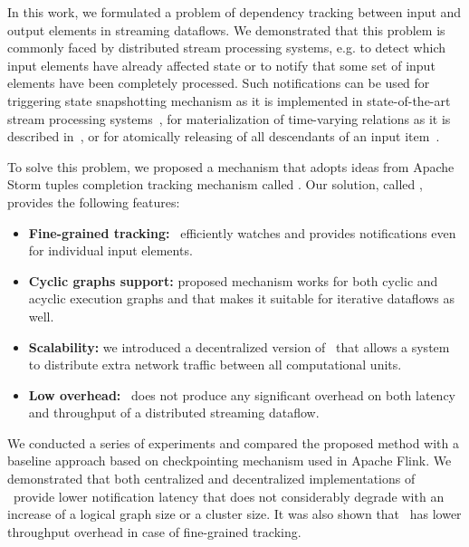 \label {fs-acker-conclusion}

In this work, we formulated a problem of dependency tracking between input and output elements in streaming dataflows. We demonstrated that this problem is commonly faced by distributed stream processing systems, e.g. to detect which input elements have already affected state or to notify that some set of input elements have been completely processed. Such notifications can be used for triggering state snapshotting mechanism as it is implemented in state-of-the-art stream processing systems~\cite{Carbone:2017:SMA:3137765.3137777, apache:storm}, for materialization of time-varying relations as it is described in~\cite{Begoli:2019:OSR:3299869.3314040}, or for atomically releasing of all descendants of an input item~\cite{we2018adbis}.

To solve this problem, we proposed a mechanism that adopts ideas from Apache Storm tuples completion tracking mechanism called \acker. Our solution, called \tracker, provides the following features:
\begin{itemize}
    \item {\bf Fine-grained tracking:} \tracker\ efficiently watches and provides notifications even for individual input elements.
    \item {\bf Cyclic graphs support:} proposed mechanism works for both cyclic and acyclic execution graphs and that makes it suitable for iterative dataflows as well. 
    \item {\bf Scalability:} we introduced a decentralized version of \tracker\ that allows a system to distribute extra network traffic between all computational units. 
    \item {\bf Low overhead:} \tracker\ does not produce any significant overhead on both latency and throughput of a distributed streaming dataflow.
\end{itemize}

We conducted a series of experiments and compared the proposed method with a baseline approach based on checkpointing mechanism used in Apache Flink. We demonstrated that both centralized and decentralized implementations of \tracker\ provide lower notification latency that does not considerably degrade with an increase of a logical graph size or a cluster size. It was also shown that \tracker\ has lower throughput overhead in case of fine-grained tracking.
